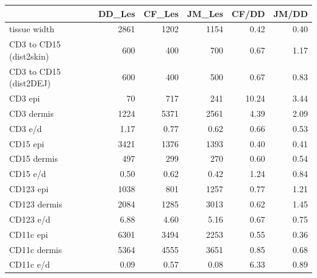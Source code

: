 \documentclass{article}
\begin{document}
\begin{tabular}{lrrrrr}
   \hline  &DD\_Les& CF\_Les& JM\_Les& CF/DD& JM/DD\\ 
\hline
tissue width & 2861 & 1202 & 1154 &  0.42 & 0.40 \\ 
  CD3 to CD15 (dist2skin) & 600 & 400 & 700 &  0.67 & 1.17 \\ 
  CD3 to CD15 (dist2DEJ) & 600 & 400 & 500 &  0.67 & 0.83 \\ 
   \hline
CD3 epi & 70 & 717 & 241 & 10.24 & 3.44 \\ 
  CD3 dermis & 1224 & 5371 & 2561 &  4.39 & 2.09 \\ 
  CD3 e/d & 1.17 & 0.77 & 0.62 &  0.66 & 0.53 \\ 
   \hline
CD15 epi & 3421 & 1376 & 1393 &  0.40 & 0.41 \\ 
  CD15 dermis & 497 & 299 & 270 &  0.60 & 0.54 \\ 
  CD15 e/d & 0.50 & 0.62 & 0.42 &  1.24 & 0.84 \\ 
   \hline
CD123 epi & 1038 & 801 & 1257 &  0.77 & 1.21 \\ 
  CD123 dermis & 2084 & 1285 & 3013 &  0.62 & 1.45 \\ 
  CD123 e/d & 6.88 & 4.60 & 5.16 &  0.67 & 0.75 \\ 
   \hline
CD11c epi & 6301 & 3494 & 2253 &  0.55 & 0.36 \\ 
  CD11c dermis & 5364 & 4555 & 3651 &  0.85 & 0.68 \\ 
  CD11c e/d & 0.09 & 0.57 & 0.08 &  6.33 & 0.89 \\ 
   \hline
\end{tabular}
\end{document}
